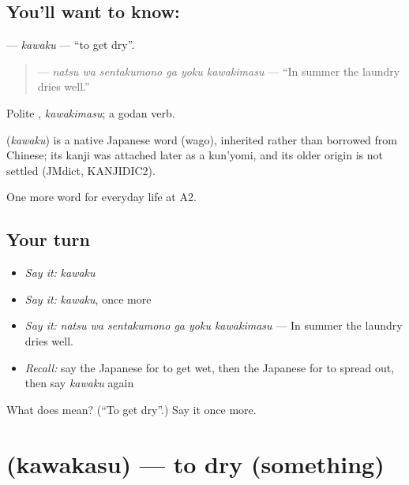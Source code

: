 \subsection*{You'll want to know: }
\textbf{} — \emph{kawaku} — \textquotedblleft{}to get dry\textquotedblright{}.

\begin{quote}
\textbf{   } — \emph{natsu wa sentakumono ga yoku kawakimasu} — \textquotedblleft{}In summer the laundry dries well.\textquotedblright{}
\end{quote}

Polite \textbf{}, \emph{kawakimasu}; a godan verb.

\begin{cousinweb}
\textbf{} (\emph{kawaku}) is a native Japanese word (wago), inherited rather than borrowed from Chinese; its kanji was attached later as a kun'yomi, and its older origin is not settled (JMdict, KANJIDIC2).
\end{cousinweb}

\begin{grammarlens}[title={What you've built}]
One more word for everyday life at A2.
\end{grammarlens}

\subsection*{Your turn}
\begin{itemize}
\raggedright
  \item \emph{Say it:} \emph{kawaku}
  \item \emph{Say it:} \emph{kawaku}, once more
  \item \emph{Say it:} \emph{natsu wa sentakumono ga yoku kawakimasu} — In summer the laundry dries well.
  \item \emph{Recall:} say the Japanese for to get wet, then the Japanese for to spread out, then say \emph{kawaku} again
\end{itemize}

\begin{tcolorbox}[breakable,colback=teal!4,colframe=teal!35!black,title={Before you move on}]
What does  mean? (\textquotedblleft{}To get dry\textquotedblright{}.) Say it once more.
\end{tcolorbox}
\section[\texorpdfstring{\ja{かわかす} (kawakasu)}{かわかす (kawakasu)}]{ (kawakasu) — to dry (something)}

